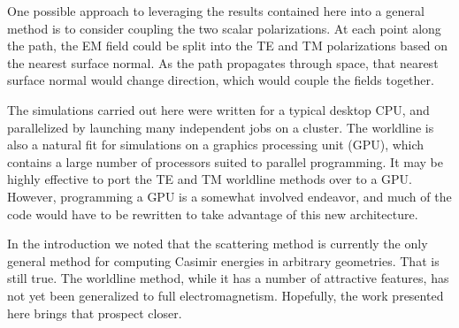 One possible approach to leveraging the results contained here into a general method is to consider coupling the two 
scalar polarizations.  
At each point along the path, the EM field could be split into the TE and TM polarizations based 
on the nearest surface normal.
As the path propagates through space, that nearest surface normal would change direction, which would couple the fields 
together.  

The simulations carried out here were written for a typical desktop CPU, and parallelized by launching
many independent jobs on a cluster.  
The worldline is also a natural fit for simulations on a graphics processing unit (GPU), 
which contains a large number of processors suited to parallel programming. 
It may be highly effective to port the TE and TM worldline methods over to a GPU.
However, programming a GPU is a somewhat involved endeavor, and much of the code would have to be 
rewritten to take advantage of this new architecture.  

In the introduction we noted that the scattering method is currently the only general
method for computing Casimir energies in arbitrary geometries. That is still true.  The worldline method,
while it has a number of attractive features, has not yet been generalized to full electromagnetism.   
Hopefully, the work presented here brings that prospect closer.  


    

